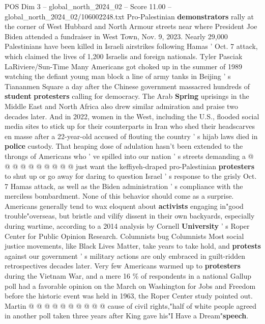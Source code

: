 \begin{textsample}{POS Dim 3 – global\_north\_2024\_02 – Score 11.00 – global\_north\_2024\_02/106002248.txt}  \label{ex:f3_pos_255}
Pro-Palestinian \textbf{demonstrators} rally at the corner of West Hubbard and North Armour streets near where President Joe Biden attended a fundraiser in West Town, Nov. 9, 2023.
Nearly 29,000 Palestinians have been killed in Israeli airstrikes following Hamas ' Oct. 7 attack, which claimed the lives of 1,200 Israelis and foreign nationals.
Tyler Pasciak LaRiviere/Sun-Time Many Americans got choked up in the summer of 1989 watching the defiant young man block a line of army tanks in Beijing ' s Tiananmen Square a day after the Chinese government massacred hundreds of \textbf{student} \textbf{protesters} calling for democracy.
The Arab \textbf{Spring} uprisings in the Middle East and North Africa also drew similar admiration and praise two decades later.
And in 2022, women in the West, including the U.S., flooded social media sites to stick up for their counterparts in Iran who shed their headscarves en masse after a 22-year-old accused of flouting the country ' s hijab laws died in \textbf{police} custody.
That heaping dose of adulation hasn't been extended to the throngs of Americans who ' ve spilled into our nation ' s streets demanding a @ @ @ @ @ @ @ @ @ @ just want the keffiyeh-draped pro-Palestinian \textbf{protesters} to shut up or go away for daring to question Israel ' s response to the grisly Oct. 7 Hamas attack, as well as the Biden administration ' s compliance with the merciless bombardment.
None of this behavior should come as a surprise.
Americans generally tend to wax eloquent about \textbf{activists} engaging in"good trouble"overseas, but bristle and vilify dissent in their own backyards, especially during wartime, according to a 2014 analysis by Cornell \textbf{University} ' s Roper Center for Public Opinion Research.
Columnists bug Columnists Most social justice movements, like Black Lives Matter, take years to take hold, and \textbf{protests} against our government ' s military actions are only embraced in guilt-ridden retrospectives decades later.
Very few Americans warmed up to \textbf{protesters} during the Vietnam War, and a mere 16 \% of respondents in a national Gallup poll had a favorable opinion on the March on Washington for Jobs and Freedom before the historic event was held in 1963, the Roper Center study pointed out.
Martin @ @ @ @ @ @ @ @ @ @ cause of civil rights,"half of white people agreed in another poll taken three years after King gave his"I Have a Dream"\textbf{speech}.

\end{textsample}
